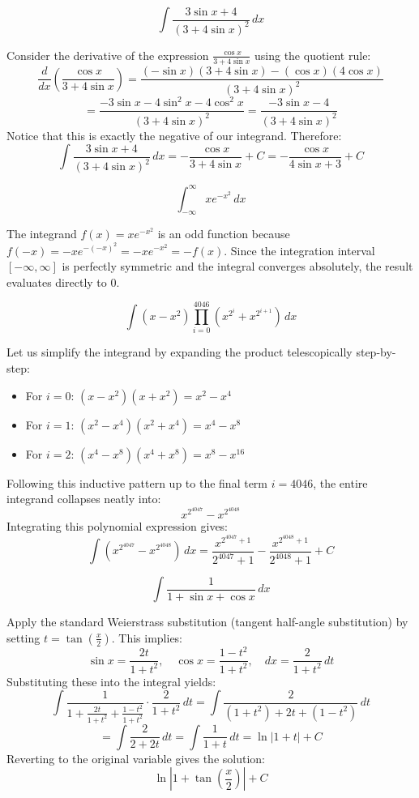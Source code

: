 \begin{questions}
    \question \[ \int \frac{3\sin x + 4}{(3+4\sin x)^2} \,dx \]
    \begin{solution}
        Consider the derivative of the expression $\frac{\cos x}{3+4\sin x}$ using the quotient rule:
        \[ \frac{d}{dx}\left(\frac{\cos x}{3+4\sin x}\right) = \frac{(-\sin x)(3+4\sin x) - (\cos x)(4\cos x)}{(3+4\sin x)^2} \]
        \[ = \frac{-3\sin x - 4\sin^2 x - 4\cos^2 x}{(3+4\sin x)^2} = \frac{-3\sin x - 4}{(3+4\sin x)^2} \]
        Notice that this is exactly the negative of our integrand. Therefore:
        \[ \int \frac{3\sin x + 4}{(3+4\sin x)^2} \,dx = -\frac{\cos x}{3+4\sin x} + C = -\frac{\cos x}{4\sin x + 3} + C \]
    \end{solution}

    \question \[ \int_{-\infty}^{\infty} xe^{-x^2} \,dx \]
    \begin{solution}
        The integrand $f(x) = xe^{-x^2}$ is an odd function because $f(-x) = -xe^{-(-x)^2} = -xe^{-x^2} = -f(x)$. Since the integration interval $[-\infty, \infty]$ is perfectly symmetric and the integral converges absolutely, the result evaluates directly to $0$.
    \end{solution}

    \question \[ \int (x-x^2)\prod_{i=0}^{4046}\left(x^{2^i}+x^{2^{i+1}}\right) \,dx \]
    \begin{solution}
        Let us simplify the integrand by expanding the product telescopically step-by-step:
        \begin{itemize}
            \item For $i=0$: $(x-x^2)(x+x^2) = x^2 - x^4$
            \item For $i=1$: $(x^2-x^4)(x^2+x^4) = x^4 - x^8$
            \item For $i=2$: $(x^4-x^8)(x^4+x^8) = x^8 - x^{16}$
        \end{itemize}
        Following this inductive pattern up to the final term $i=4046$, the entire integrand collapses neatly into:
        \[ x^{2^{4047}} - x^{2^{4048}} \]
        Integrating this polynomial expression gives:
        \[ \int \left(x^{2^{4047}} - x^{2^{4048}}\right) \,dx = \frac{x^{2^{4047}+1}}{2^{4047}+1} - \frac{x^{2^{4048}+1}}{2^{4048}+1} + C \]
    \end{solution}

    \question \[ \int \frac{1}{1+\sin x + \cos x} \,dx \]
    \begin{solution}
        Apply the standard Weierstrass substitution (tangent half-angle substitution) by setting $t = \tan\left(\frac{x}{2}\right)$. This implies:
        \[ \sin x = \frac{2t}{1+t^2}, \quad \cos x = \frac{1-t^2}{1+t^2}, \quad dx = \frac{2}{1+t^2} \,dt \]
        Substituting these into the integral yields:
        \[ \int \frac{1}{1 + \frac{2t}{1+t^2} + \frac{1-t^2}{1+t^2}} \cdot \frac{2}{1+t^2} \,dt = \int \frac{2}{(1+t^2) + 2t + (1-t^2)} \,dt \]
        \[ = \int \frac{2}{2+2t} \,dt = \int \frac{1}{1+t} \,dt = \ln|1+t| + C \]
        Reverting to the original variable gives the solution:
        \[ \ln\left|1 + \tan\left(\frac{x}{2}\right)\right| + C \]
    \end{solution}


\end{questions}
